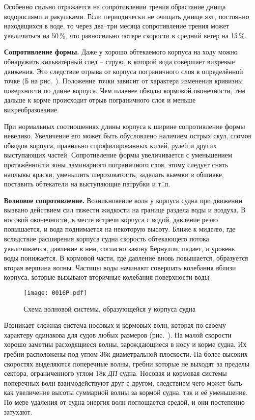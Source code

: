 Особенно сильно отражается на сопротивлении трения обрастание днища
водорослями и ракушками. Если периодически не очищать днище яхт,
постоянно находящихся в воде, то через два--три месяца сопротивление
трения может увеличиться на 50\,\%, что равносильно потере
скорости в средний ветер на 15\,\%.

\textbf{Сопротивление формы.} Даже у хорошо
обтекаемого корпуса на ходу можно обнаружить кильватерный след \---
струю, в которой вода совершает вихревые движения. Это следствие
отрыва от корпуса пограничного слоя в определённой точке (Б на
рис.~). Положение точки зависит от характера изменения
кривизны поверхности по длине корпуса. Чем плавнее обводы кормовой
оконечности, тем дальше к корме происходит отрыв пограничного слоя и
меньше вихреобразование.

При нормальных соотношениях длины корпуса к ширине сопротивление формы
невелико. Увеличение его может быть обусловлено наличием острых скул,
сломов обводов корпуса, правильно спрофилированных килей, рулей и
других выступающих частей. Сопротивление формы увеличивается с
уменьшением протяжённости зоны ламинарного пограничного слоя, этому
следует снять наплывы краски, уменьшить шероховатость, заделать выемки
в обшивке, поставить обтекатели на выступающие патрубки и т.\=,п.

\textbf{Волновое сопротивление.}
Возникновение волн у корпуса судна при движении вызвано действием сил
тяжести жидкости на границе раздела воды и воздуха. В носовой
оконечности, в месте встречи корпуса с водой, давление резко
повышается, и вода поднимается на некоторую высоту. Ближе к миделю,
где вследствие расширения корпуса судна скорость обтекающего потока
увеличивается, давление в нем, согласно закону Бернулли, падает, и
уровень воды понижается. В кормовой части, где давление вновь
повышается, образуется вторая вершина волны. Частицы воды начинают
совершать колебания вблизи корпуса, которые вызывают вторичные
колебания поверхности воды.

\begin{figure*}[htb]
  \centering
  \texttt{[image: 0016P.pdf]}
  \caption{Схема волновой системы, образующейся у корпуса судна}
  \label{fig:16}
\end{figure*}

Возникает сложная система носовых и кормовых волн, которая по своему
характеру одинакова для судов любых размеров (рис.~). На малой
скорости хорошо заметны расходящиеся волны, зарождающиеся в носу и
корме судна. Их гребни расположены под углом 36\gr к
диаметральной плоскости. На более высоких скоростях выделяются
поперечные волны, гребни которые не выходят за пределы сектора,
ограниченного углом 18\gr к \textit{ДП} судна. Носовая и
кормовая системы поперечных волн взаимодействуют друг с другом,
следствием чего может быть как увеличение высоты суммарной волны за
кормой судна, так и её уменьшение. По мере удаления от судна энергия
волн поглощается средой, и они постепенно затухают.

